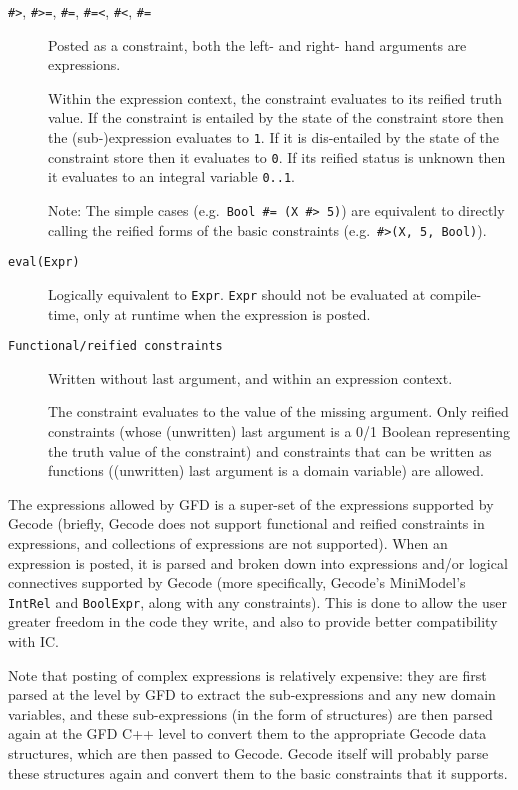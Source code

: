 \begin{description}
\item[
    \texttt{\#>}, \texttt{\#>=}, \texttt{\#=}, \texttt{\#=<},
 \texttt{\#<},
    \texttt{\#\bsl=}]

    Posted as a constraint, both the left- and right- hand arguments are
    expressions.

    Within the expression context, the constraint evaluates to its
    reified truth value.  If the constraint is entailed by the
    state of the constraint store then the (sub-)expression
    evaluates to \verb|1|.  If it is dis-entailed by the state of
    the constraint store then it evaluates to \verb|0|. If its
    reified status is unknown then it evaluates to an integral
    variable \verb|0..1|.

    Note: The simple cases (e.g.\ \verb|Bool #= (X #> 5)|) are
    equivalent to directly calling the reified forms of the basic
    constraints (e.g.\ \verb|#>(X, 5, Bool)|).

\item[\texttt{eval(Expr)}]
            Logically equivalent to \verb'Expr'.
	    \verb'Expr' should not be evaluated at compile-time, only at
	    runtime when the expression is posted.

\item[\texttt{Functional/reified constraints}]
            Written without last argument, and within an expression context.

            The constraint evaluates to the value of the missing argument.
            Only reified constraints (whose (unwritten) last argument
            is a 0/1 Boolean representing the truth value of the constraint) 
            and constraints that can be written as 
            functions ((unwritten) last argument is a domain variable) are 
            allowed.

\end{description}
 
The expressions allowed by GFD is a super-set of the expressions supported by 
Gecode (briefly, Gecode does not support functional and 
reified constraints in expressions, and collections of expressions are not 
supported). When an expression is posted, it is parsed and broken down into 
expressions and/or logical connectives supported by Gecode (more 
specifically, Gecode's MiniModel's {\tt IntRel} and {\tt BoolExpr}, along 
with any constraints). This is done to 
allow the user greater freedom in the code they write, and also to provide 
better compatibility with IC. 

Note that posting of complex expressions is relatively expensive: they are 
first parsed at the \eclipse level by GFD to extract the sub-expressions and 
any new domain variables, and these sub-expressions (in the form of 
\eclipse structures) are then parsed again at the GFD C++ level to convert
them to the appropriate Gecode data structures, which are then passed to
Gecode. Gecode itself will probably parse these structures again
and convert them to the basic constraints that it supports. 


